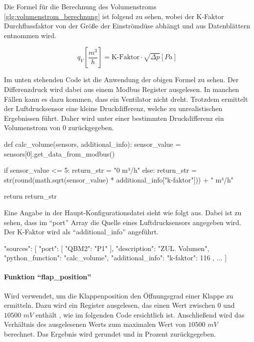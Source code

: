 Die Formel für die Berechnung des Volumenstroms \eqref{glg:volumenstrom_berechnung} ist folgend zu sehen, wobei der K-Faktor \bzw Durchflussfaktor \cite[vgl.][]{rox_klimatechnik:o.J.} von der Größe der Einströmdüse abhängt und aus Datenblättern entnommen wird. \cite[vgl.][171]{ebmpapst:2021}

\begin{equation}
	q_{V}\left[\frac{m^{3}}{h}\right] = \text{K-Faktor} \cdot \sqrt{\Delta p} \left[Pa\right]
	\label{glg:volumenstrom_berechnung}
\end{equation} 

Im unten stehenden Code ist die Anwendung der obigen Formel zu sehen. Der Differenzdruck wird dabei aus einem Modbus Register ausgelesen. In manchen Fällen kann es dazu kommen, dass ein Ventilator nicht dreht. Trotzdem ermittelt der Luftdrucksensor eine kleine Druckdifferenz, welche zu unrealistischen Ergebnissen führt. Daher wird unter einer bestimmten Druckdifferenz ein Volumenstrom von $0$ zurückgegeben.

\begin{pythoncode}
def calc_volume(sensors, additional_info):
	sensor_value = sensors[0].get_data_from_modbus()
	
	if sensor_value <= 5:
		return_str = "0 m³/h"
	else:
		return_str = str(round(math.sqrt(sensor_value) * additional_info["k-faktor"])) + " m³/h"
	
	return return_str
\end{pythoncode}

Eine Angabe in der Haupt-Konfigurationsdatei sieht wie folgt aus. Dabei ist zu sehen, dass im \enquote{port} Array die Quelle eines Luftdrucksensors angegeben wird. Der K-Faktor wird als \enquote{additional\_info} angeführt.

\begin{jsoncode}
"sources": [
	{
		"port": [
			{"QBM2": "P1"}
		],
		"description": "ZUL. Volumen",
		"python_function": "calc_volume",
		"additional_info": {"k-faktor": 116}
	},
	...
]
\end{jsoncode}



\paragraph{Funktion \enquote{flap\_position}}
Wird verwendet, um die Klappenposition \bzw den Öffnungsgrad einer Klappe zu ermitteln. 
Dazu wird ein Register ausgelesen, das einen Wert zwischen $0$ und $10500$ $mV$ enthält \cite[vgl.][17]{siemens:2021}, wie im folgenden Code ersichtlich ist. Anschließend wird das Verhältnis des ausgelesenen Werts zum maximalen Wert von $10500$ $mV$ berechnet. Das Ergebnis wird gerundet und in Prozent zurückgegeben.


